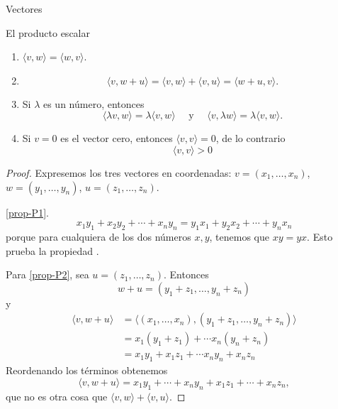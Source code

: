 \begin{chapter}{Vectores}
\begin{section}{El producto escalar}
\begin{proposicion}
        \begin{enumerate}[label=\textbf{P\arabic*.},ref=P\arabic*]
            \item\label{prop-P1}	$\langle v , w \rangle = \langle w , v \rangle$.
            \item\label{prop-P2} 
            \begin{equation*}
                \langle v , w + u \rangle =\langle v , w \rangle + \langle v , u \rangle = \langle w +u , v \rangle.
            \end{equation*}
            \item\label{prop-P3} Si $\lambda$ es un número, entonces 
            \begin{equation*}
                \langle \lambda v , w \rangle = \lambda \langle v , w \rangle \quad \text{ y } \quad  \langle v , \lambda w \rangle = \lambda \langle v , w \rangle.
            \end{equation*}
            \item\label{prop-P4} Si $v=0$ es el vector cero, entonces $\langle v , v \rangle =0$,  de lo contrario
            \begin{equation*}
                \langle v , v \rangle >0
            \end{equation*}
        \end{enumerate}
        \end{proposicion}
        \begin{proof} Expresemos los tres vectores en coordenadas:  $v = (x_1, \ldots,x_n)$, $w =  (y_1, \ldots, y_n)$, $u = (z_1, \ldots, z_n)$. 

            \ref{prop-P1}.
        \begin{equation*}
            x_1y_1 + x_2y_2+\cdots+x_ny_n = y_1x_1 + y_2x_2+\cdots+y_nx_n
        \end{equation*}
        porque para cualquiera de los dos números $x, y$, tenemos que $xy=yx$. Esto prueba la propiedad . 
        
        Para \ref{prop-P2}, sea $u = (z_1, \ldots, z_n)$. Entonces
        \begin{equation*}
            w + u = (y_1+z_1, \ldots, y_n+ z_n)
        \end{equation*}
        y
        \begin{align*}
            \langle v , w + u \rangle &= \langle (x_1, \ldots,x_n) , (y_1+z_1, \ldots, y_n+ z_n) \rangle\\
            &= x_1(y_1+z_1) + \cdots x_n(y_n+z_n) \\
            &= x_1y_1+x_1z_1 + \cdots x_ny_n+x_nz_n
        \end{align*}
        Reordenando los términos obtenemos
        \begin{equation*}
                \langle v , w + u \rangle =  x_1y_1+\cdots +  x_ny_n +x_1z_1 + \cdots+x_nz_n,
        \end{equation*}
        que no es otra cosa que $\langle v , w \rangle + \langle v , u \rangle$.
        

\end{proof}
\end{section}
\end{chapter}
